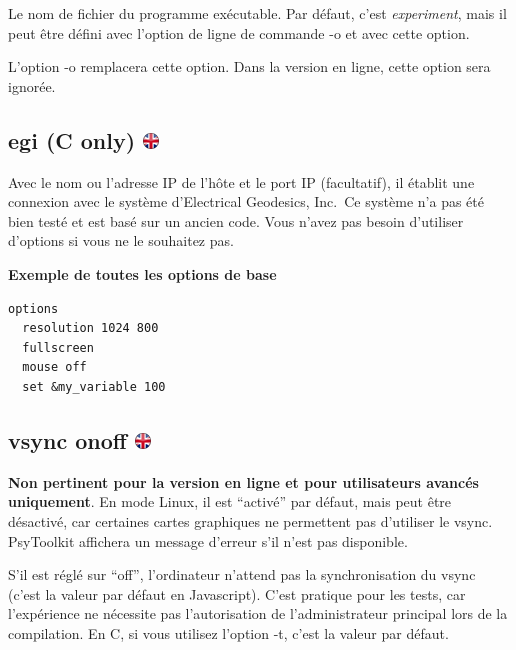 \documentclass[
]{book}
\begin{document}
Le nom de fichier du programme exécutable. Par défaut, c'est \emph{experiment}, mais il peut être défini avec l'option de ligne de commande -o et avec cette option.

L'option -o remplacera cette option. Dans la version en ligne, cette option sera ignorée.

\hypertarget{egi-c-only}{%
\subsection[egi (C only) ]{\texorpdfstring{egi (C only) \href{https://www.psytoolkit.org/doc3.2.0/syntax.html\#options-egi}{\protect\includegraphics{img/ukflag.png}}}{egi (C only) }}\label{egi-c-only}}

Avec le nom ou l'adresse IP de l'hôte et le port IP (facultatif), il établit une connexion avec le système d'Electrical Geodesics, Inc.~Ce système n'a pas été bien testé et est basé sur un ancien code. Vous n'avez pas besoin d'utiliser d'options si vous ne le souhaitez pas.

\textbf{Exemple de toutes les options de base}

\begin{verbatim}
options
  resolution 1024 800
  fullscreen
  mouse off
  set &my_variable 100
\end{verbatim}

\hypertarget{vsync-onoff}{%
\subsection[vsync on\textbar off ]{\texorpdfstring{vsync on\textbar off \href{https://www.psytoolkit.org/doc3.2.0/syntax.html\#options_vsync_off}{\protect\includegraphics{img/ukflag.png}}}{vsync on\textbar off }}\label{vsync-onoff}}

\textbf{Non pertinent pour la version en ligne et pour utilisateurs avancés uniquement}. En mode Linux, il est ``activé'' par défaut, mais peut être désactivé, car certaines cartes graphiques ne permettent pas d'utiliser le vsync. PsyToolkit affichera un message d'erreur s'il n'est pas disponible.

S'il est réglé sur ``off'', l'ordinateur n'attend pas la synchronisation du vsync (c'est la valeur par défaut en Javascript). C'est pratique pour les tests, car l'expérience ne nécessite pas l'autorisation de l'administrateur principal lors de la compilation. En C, si vous utilisez l'option -t, c'est la valeur par défaut.
\end{document}
